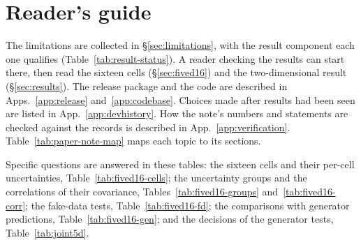 \section*{Reader's guide}
\label{sec:front-guide}

The limitations are collected in \S\ref{sec:limitations}, with the result component each one qualifies (Table~\ref{tab:result-status}). A reader checking the results can start there, then read the sixteen cells (\S\ref{sec:fived16}) and the two-dimensional result (\S\ref{sec:results}). The release package and the code are described in Apps.~\ref{app:release} and~\ref{app:codebase}. Choices made after results had been seen are listed in App.~\ref{app:devhistory}. How the note's numbers and statements are checked against the records is described in App.~\ref{app:verification}. Table~\ref{tab:paper-note-map} maps each topic to its sections.

Specific questions are answered in these tables: the sixteen cells and their per-cell uncertainties, Table~\ref{tab:fived16-cells}; the uncertainty groups and the correlations of their covariance, Tables~\ref{tab:fived16-groups} and~\ref{tab:fived16-corr}; the fake-data tests, Table~\ref{tab:fived16-fd}; the comparisons with generator predictions, Table~\ref{tab:fived16-gen}; and the decisions of the generator tests, Table~\ref{tab:joint5d}.

